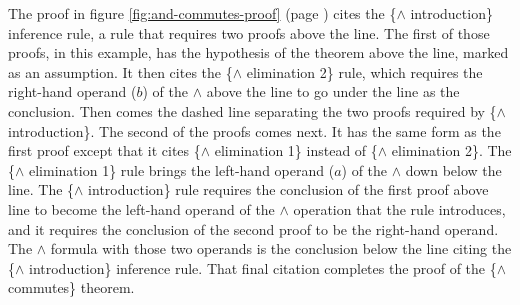 The proof in
figure \ref{fig:and-commutes-proof} (page \pageref{fig:and-commutes-proof})
cites the \{$\wedge$ introduction\} inference rule,
a rule that requires two proofs above the line.
The first of those proofs, in this example, has the hypothesis
of the theorem above the line, marked as an assumption.
It then cites the \{$\wedge$ elimination 2\} rule,
which requires the right-hand operand ($b$) of the $\wedge$
above the line to go under the line as the conclusion.
Then comes the dashed line separating
the two proofs required by \{$\wedge$ introduction\}.
The second of the proofs comes next.
It has the same form as the first proof
except that it cites \{$\wedge$ elimination 1\} instead of \{$\wedge$ elimination 2\}.
The \{$\wedge$ elimination 1\} rule brings the left-hand operand ($a$) of the $\wedge$
down below the line.
The \{$\wedge$ introduction\} rule requires the
conclusion of the first proof above line to
become the left-hand operand of the $\wedge$
operation that the rule introduces,
and it requires the conclusion of the second
proof to be the right-hand operand.
The $\wedge$ formula with those two operands
is the conclusion below the line citing the \{$\wedge$ introduction\} inference rule.
That final citation completes the proof of the \{$\wedge$ commutes\} theorem.

